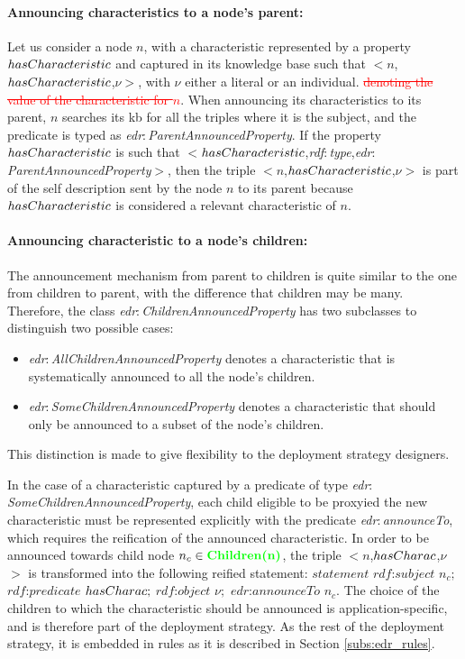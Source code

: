\documentclass{iosart2c}
\newcommand{\added}[1]{\textcolor{green}{\textbf{#1}}}
\newcommand{\removed}[1]{\textcolor{red}{\sout{#1}}}
\newcommand{\namespace}[1]{\textit{#1$:$}}
\newcommand{\concept}[2]{\namespace{#1}\-\textit{#2}}
\newcommand{\triplet}[3]{$<$#1,\textit{#2},#3$>$}
\begin{document}
\paragraph{Announcing characteristics to a node's parent:}
Let us consider a node $n$, with a characteristic represented by a property $has\-Charac\-teris\-tic$ and captured in its knowledge base such that \triplet{$n$}{$has\-Charac\-teris\-tic$}{$\nu$}, with $\nu$ either a literal or an individual. \removed{denoting the value of the characteristic for $n$}.
When announcing its characteristics to its parent, $n$ searches its \gls{kb} for all the triples where it is the subject, and the predicate is typed as \concept{edr}{Parent\-Announced\-Property}.
If the property $has\-Charac\-teris\-tic$ is such that \triplet{$has\-Charac\-teris\-tic$}{\concept{rdf}{type}}{\concept{edr}{Parent\-Announced\-Property}}, then the triple \triplet{$n$}{$has\-Charac\-teris\-tic$}{$\nu$} is part of the self description sent by the node $n$ to its parent because $has\-Charac\-teris\-tic$ is considered a relevant characteristic of $n$.

\paragraph{Announcing characteristic to a node's children:}
The announcement mechanism from parent to children is quite similar to the one from children to parent, with the difference that children may be many.
Therefore, the class \concept{edr}{Children\-Announced\-Property} has two subclasses to distinguish two possible cases:
\begin{itemize}
	\item \concept{edr}{All\-Children\-Announced\-Property} denotes a characteristic that is systematically announced to all the node's children.
	\item \concept{edr}{Some\-Children\-Announced\-Property} denotes a characteristic that should only be announced to a subset of the node's children. 
\end{itemize}
This distinction is made to give flexibility to the deployment strategy designers.

In the case of a characteristic captured by a predicate of type \concept{edr}{Some\-Children\-Announced\-Property}, each child eligible to be proxyied the new characteristic must be represented explicitly with the predicate \concept{edr}{announce\-To}, which requires the reification of the announced characteristic.
In order to be announced towards child node $n_{c}\in \added{Children(n)}$, the triple \triplet{$n$}{$has\-Charac$}{$\nu$} is transformed into the following reified statement: 
$statement$ $rdf$:$subject$ $n_{c};$ $rdf$:$predicate$ $has\-Charac;$ $rdf$:$object$ $\nu;$ $edr$:$announceTo$ $n_{c}$. 
The choice of the children to which the characteristic should be announced is application-specific, and is therefore part of the deployment strategy.
As the rest of the deployment strategy, it is embedded in rules as it is described in Section \textsection \ref{subs:edr_rules}.
\end{document}
